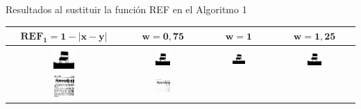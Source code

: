 \documentclass{beamer}
\theoremstyle{plain} %
\theoremstyle{definition}
\newcommand{\abs}[1]{\left\vert#1\right\vert}
\newcommand{\bb}{\bfseries}
\begin{document}
\begin{frame}{Resultados al sustituir la función REF en el Algoritmo 1}
  \begin{table}
  \centering
  \begin{tabular}{c||c|c|c} 
  $\mathbf{REF_1=1-\abs{x-y}}$ & $\mathbf{w=0,75}$ &\bb $\mathbf{w=1}$ &\bb $\mathbf{w=1,25}$\\\hline\hline
  \includegraphics[width=0.2\textwidth]{img/res/e1a/alg1tipo1-chair.jpg} &
  \includegraphics[width=0.2\textwidth]{img/res/e1a/alg1tipo6-chair.jpg} &
  \includegraphics[width=0.2\textwidth]{img/res/e1a/alg1tipo6d0.75-chair.jpg} &
  \includegraphics[width=0.2\textwidth]{img/res/e1a/alg1tipo6d1.25-chair.jpg} \\
  \includegraphics[width=0.2\textwidth]{img/res/e1a/alg1tipo1-09.jpg} &
  \includegraphics[width=0.2\textwidth]{img/res/e1a/alg1tipo6-09.jpg} &

\end{tabular}
\end{table}
\end{frame}
\end{document}
